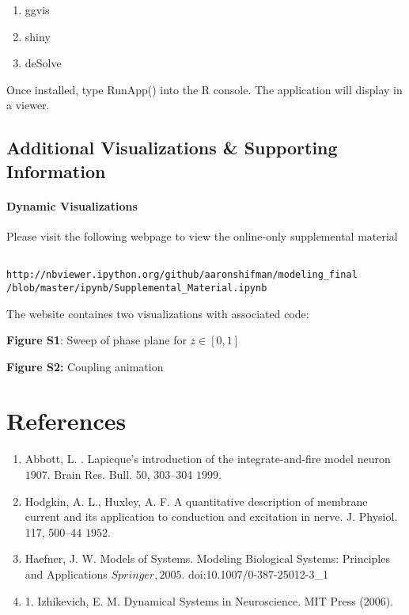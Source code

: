 \documentclass[11pt]{report}
\begin{document}
\begin{enumerate}
  \item ggvis
  \item shiny
  \item deSolve
\end{enumerate}

Once installed, type RunApp() into the R console. The application will display in a viewer.


\section{Additional Visualizations \& Supporting Information} %
\label{sec:web_app}


\subsubsection{Dynamic Visualizations} %
\label{ssub:dynamic_visualizations}

Please visit the following webpage to view the online-only supplemental material

\begin{lstlisting}
  
http://nbviewer.ipython.org/github/aaronshifman/modeling_final
/blob/master/ipynb/Supplemental_Material.ipynb

\end{lstlisting}


The website containes two visualizations with associated code:

\textbf{Figure S1}: Sweep of phase plane for $z \in [0,1]$

\textbf{Figure S2:} Coupling animation



\chapter{References} %
\label{sec:references}

\begin{enumerate}
  \item Abbott, L. . Lapicque’s introduction of the integrate-and-fire model neuron \(1907\). Brain Res. Bull. 50, 303–304 \(1999\).
  \item Hodgkin, A. L., Huxley, A. F. A quantitative description of membrane current and its application to conduction and excitation in nerve. J. Physiol. 117, 500–44 \(1952\).
  \item Haefner, J. W. Models of Systems. Modeling Biological Systems: Principles and Applications \(Springer, 2005\). doi:10.1007/0-387-25012-3\_1
  \item 1. Izhikevich, E. M. Dynamical Systems in Neuroscience. MIT Press (2006).
\end{enumerate}


\end{document}
